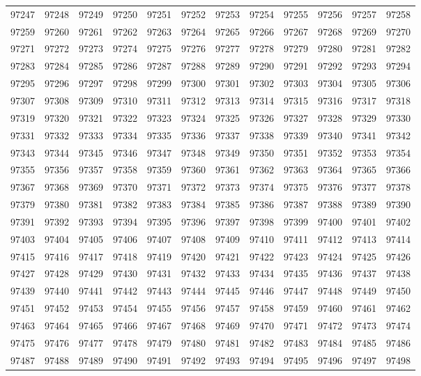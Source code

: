 \begin{center}
\begin{longtable}{llllllllllll}
97247 &97248 &97249 &97250 &97251 &97252 &97253 &97254 &97255 &97256 &97257 &97258 \\
97259 &97260 &97261 &97262 &97263 &97264 &97265 &97266 &97267 &97268 &97269 &97270 \\
97271 &97272 &97273 &97274 &97275 &97276 &97277 &97278 &97279 &97280 &97281 &97282 \\
97283 &97284 &97285 &97286 &97287 &97288 &97289 &97290 &97291 &97292 &97293 &97294 \\
97295 &97296 &97297 &97298 &97299 &97300 &97301 &97302 &97303 &97304 &97305 &97306 \\
97307 &97308 &97309 &97310 &97311 &97312 &97313 &97314 &97315 &97316 &97317 &97318 \\
97319 &97320 &97321 &97322 &97323 &97324 &97325 &97326 &97327 &97328 &97329 &97330 \\
97331 &97332 &97333 &97334 &97335 &97336 &97337 &97338 &97339 &97340 &97341 &97342 \\
97343 &97344 &97345 &97346 &97347 &97348 &97349 &97350 &97351 &97352 &97353 &97354 \\
97355 &97356 &97357 &97358 &97359 &97360 &97361 &97362 &97363 &97364 &97365 &97366 \\
97367 &97368 &97369 &97370 &97371 &97372 &97373 &97374 &97375 &97376 &97377 &97378 \\
97379 &97380 &97381 &97382 &97383 &97384 &97385 &97386 &97387 &97388 &97389 &97390 \\
97391 &97392 &97393 &97394 &97395 &97396 &97397 &97398 &97399 &97400 &97401 &97402 \\
97403 &97404 &97405 &97406 &97407 &97408 &97409 &97410 &97411 &97412 &97413 &97414 \\
97415 &97416 &97417 &97418 &97419 &97420 &97421 &97422 &97423 &97424 &97425 &97426 \\
97427 &97428 &97429 &97430 &97431 &97432 &97433 &97434 &97435 &97436 &97437 &97438 \\
97439 &97440 &97441 &97442 &97443 &97444 &97445 &97446 &97447 &97448 &97449 &97450 \\
97451 &97452 &97453 &97454 &97455 &97456 &97457 &97458 &97459 &97460 &97461 &97462 \\
97463 &97464 &97465 &97466 &97467 &97468 &97469 &97470 &97471 &97472 &97473 &97474 \\
97475 &97476 &97477 &97478 &97479 &97480 &97481 &97482 &97483 &97484 &97485 &97486 \\
97487 &97488 &97489 &97490 &97491 &97492 &97493 &97494 &97495 &97496 &97497 &97498 \\

\end{longtable}
\end{center}

